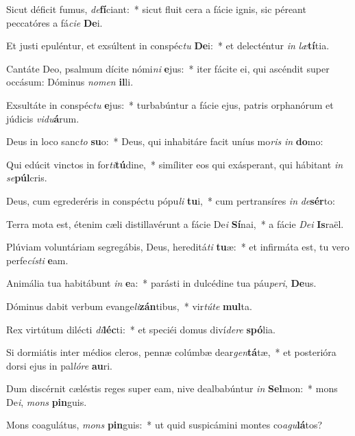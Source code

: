 \item Sicut déficit fumus, \textit{de}\textbf{fí}ciant:~* sicut fluit cera a fácie ignis, sic péreant peccatóres a fá\textit{ci}\textit{e} \textbf{De}i.
\item Et justi epuléntur, et exsúltent in conspéc\textit{tu} \textbf{De}i:~* et delecténtur \textit{in} \textit{læ}\textbf{tí}tia.
\item Cantáte Deo, psalmum dícite nómi\textit{ni} \textbf{e}jus:~* iter fácite ei, qui ascéndit super occásum: Dóminus \textit{no}\textit{men} \textbf{il}li.
\item Exsultáte in conspéc\textit{tu} \textbf{e}jus:~* turbabúntur a fácie ejus, patris orphanórum et júdicis \textit{vi}\textit{du}\textbf{á}rum.
\item Deus in loco sanc\textit{to} \textbf{su}o:~* Deus, qui inhabitáre facit uníus mo\textit{ris} \textit{in} \textbf{do}mo:
\item Qui edúcit vinctos in for\textit{ti}\textbf{tú}dine,~* simíliter eos qui exásperant, qui hábitant \textit{in} \textit{se}\textbf{púl}cris.
\item Deus, cum egrederéris in conspéctu pópu\textit{li} \textbf{tu}i,~* cum pertransíres \textit{in} \textit{de}\textbf{sér}to:
\item Terra mota est, étenim cæli distillavérunt a fácie De\textit{i} \textbf{Sí}nai,~* a fácie \textit{De}\textit{i} \textbf{Is}raël.
\item Plúviam voluntáriam segregábis, Deus, hereditá\textit{ti} \textbf{tu}æ:~* et infirmáta est, tu vero perfe\textit{cís}\textit{ti} \textbf{e}am.
\item Animália tua habitábunt \textit{in} \textbf{e}a:~* parásti in dulcédine tua páu\textit{pe}\textit{ri}, \textbf{De}us.
\item Dóminus dabit verbum evange\textit{li}\textbf{zán}tibus,~* vir\textit{tú}\textit{te} \textbf{mul}ta.
\item Rex virtútum dilécti \textit{di}\textbf{léc}ti:~* et speciéi domus diví\textit{de}\textit{re} \textbf{spó}lia.
\item Si dormiátis inter médios cleros, pennæ colúmbæ dear\textit{gen}\textbf{tá}tæ,~* et posterióra dorsi ejus in pal\textit{ló}\textit{re} \textbf{au}ri.
\item Dum discérnit cæléstis reges super eam, nive dealbabúntur \textit{in} \textbf{Sel}mon:~* mons De\textit{i}, \textit{mons} \textbf{pin}guis.
\item Mons coagulátus, \textit{mons} \textbf{pin}guis:~* ut quid suspicámini montes co\textit{a}\textit{gu}\textbf{lá}tos?
